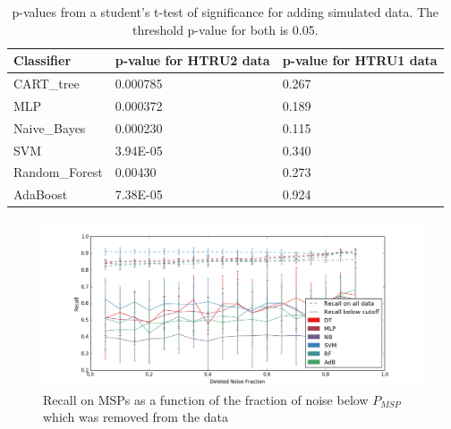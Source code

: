 \documentclass[12pt]{article}
\begin{document}
\begin{table}[]
\centering

\begin{tabular}{|l|l|l|}
\hline
\textbf{Classifier} & \textbf{p-value for HTRU2 data} & \textbf{p-value for HTRU1 data} \\ \hline
CART\_tree          & 0.000785                        & 0.267                           \\ \hline
MLP                 & 0.000372                        & 0.189                           \\ \hline
Naive\_Bayes        & 0.000230                        & 0.115                           \\ \hline
SVM                 & 3.94E-05                        & 0.340                           \\ \hline
Random\_Forest      & 0.00430                         & 0.273                           \\ \hline
AdaBoost            & 7.38E-05                        & 0.924                           \\ \hline
\end{tabular}
\caption{p-values from a student's t-test of significance for adding simulated data. The threshold p-value for both is 0.05.}
\label{htru2pvalue}
\end{table}

\begin{figure}[h!]
\begin{center}
\includegraphics[scale=0.3]{acc_vs_noise_cutoff_all_noise.png}
\caption{Recall on MSPs as a function of the fraction of noise below $P_{MSP}$ which was removed from the data}
\label{allnoisecutacc}
\end{center}
\end{figure}
\end{document}

